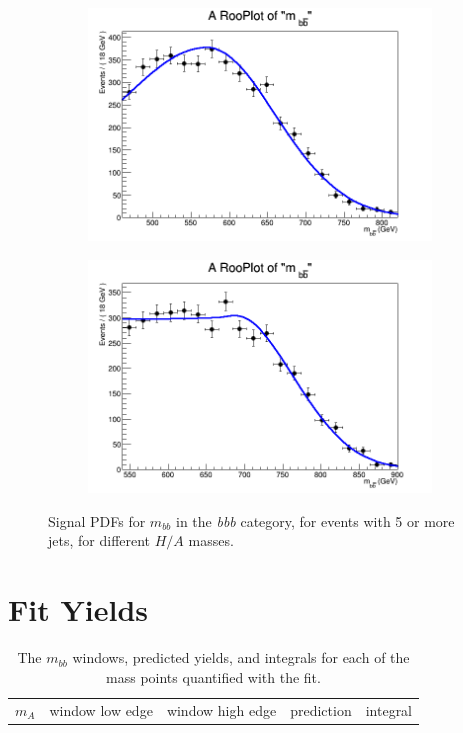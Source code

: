 \begin{figure}[phtb!]
\begin{center}
  \begin{subfigure}[$m_{A}=700$ GeV]{0.4\textwidth}\includegraphics[width=\textwidth]{FitResults/images/fitMC_bAbb700_3.png}\end{subfigure}
  \begin{subfigure}[$m_{A}=800$ GeV]{0.4\textwidth}\includegraphics[width=\textwidth]{FitResults/images/fitMC_bAbb800_3.png}\end{subfigure}
  \caption{Signal PDFs for $m_{bb}$ in the {\it bbb} category, for events with 5 or more jets, for different $H/A$ masses. \label{fig:signalPDFs_5j}}
    \end{center}
\end{figure}



\section{Fit Yields}
\begin{table}
\caption{The $m_{bb}$ windows, predicted yields, and integrals for each of the
    mass points quantified with the fit. \label{tab:bkg_fit_yields}}
    \begin{tabular}{ c c c c c }
        $m_A$ & window low edge & window high edge & prediction & integral \\
    \end{tabular}
\end{table}




